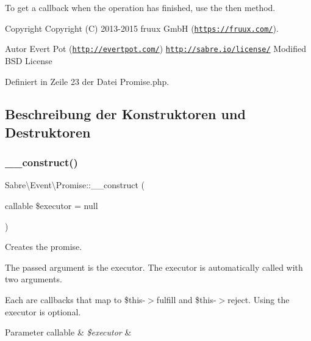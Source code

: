 To get a callback when the operation has finished, use the {\ttfamily then} method.

\begin{DoxyCopyright}{Copyright}
Copyright (C) 2013-\/2015 fruux GmbH (\href{https://fruux.com/}{\tt https\+://fruux.\+com/}). 
\end{DoxyCopyright}
\begin{DoxyAuthor}{Autor}
Evert Pot (\href{http://evertpot.com/}{\tt http\+://evertpot.\+com/})  \href{http://sabre.io/license/}{\tt http\+://sabre.\+io/license/} Modified B\+SD License 
\end{DoxyAuthor}


Definiert in Zeile 23 der Datei Promise.\+php.



\subsection{Beschreibung der Konstruktoren und Destruktoren}
\mbox{\label{class_sabre_1_1_event_1_1_promise_a96e07267a63bbfd68f8277405594d32f}} 
\subsubsection{\texorpdfstring{\+\_\+\+\_\+construct()}{\_\_construct()}}
{\footnotesize\ttfamily Sabre\textbackslash{}\+Event\textbackslash{}\+Promise\+::\+\_\+\+\_\+construct (\begin{DoxyParamCaption}\item[{callable}]{\$executor = {\ttfamily null} }\end{DoxyParamCaption})}

Creates the promise.

The passed argument is the executor. The executor is automatically called with two arguments.

Each are callbacks that map to \$this-\/$>$fulfill and \$this-\/$>$reject. Using the executor is optional.


\begin{DoxyParams}[1]{Parameter}
callable & {\em \$executor} & \\
\hline
\end{DoxyParams}


